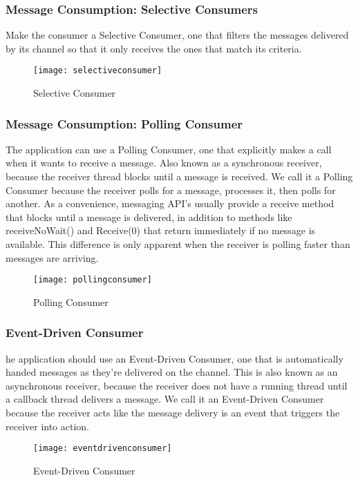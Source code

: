 \subsubsection{Message Consumption: Selective Consumers}
Make the consumer a Selective Consumer, one that filters the messages delivered by its channel so that it only receives the ones that match its criteria.

\begin{figure}[H]
  \center
  \texttt{[image: selectiveconsumer]}
  \caption{Selective Consumer}
\end{figure}

\subsubsection{Message Consumption: Polling Consumer}
The application can use a Polling Consumer, one that explicitly makes a call when it wants to receive a message. Also known as a synchronous receiver, because the receiver thread blocks until a message is received. We call it a Polling Consumer because the receiver polls for a message, processes it, then polls for another. As a convenience, messaging API’s usually provide a receive method that blocks until a message is delivered, in addition to methods like receiveNoWait() and Receive(0) that return immediately if no message is available. This difference is only apparent when the receiver is polling faster than messages are arriving.

\begin{figure}[H]
  \center
  \texttt{[image: pollingconsumer]}
  \caption{Polling Consumer}
\end{figure}

\subsubsection{Event-Driven Consumer}
he application should use an Event-Driven Consumer, one that is automatically handed messages as they’re delivered on the channel. This is also known as an asynchronous receiver, because the receiver does not have a running thread until a callback thread delivers a message. We call it an Event-Driven Consumer because the receiver acts like the message delivery is an event that triggers the receiver into action.

\begin{figure}[H]
  \center
  \texttt{[image: eventdrivenconsumer]}
  \caption{Event-Driven Consumer}
\end{figure}

